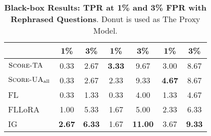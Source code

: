 \begin{table}[t]
\begin{minipage}{0.43\textwidth}
{\begin{tabular}{lcccccc}
             \cmidrule(l){4-5}
             \cmidrule(l){6-7}
             & 1\% & 3\% & 1\% & 3\% & 1\% & 3\% \\
            \midrule
            $\textsc{Score-TA}$& 0.33 & 2.67 & \textbf{3.33} & 9.67 & 3.00 & 8.67 \\
            $\textsc{Score-UA}_{\text{all}}$& 0.33 & 2.67 & 2.33 & 9.33 & \textbf{4.67} & 8.67 \\
            \midrule
            FL & 0.33 & 1.33 & 0.33 & 4.00 & 1.33 & 4.67 \\
            FLLoRA & 1.00 & 5.33 & 1.67 & 5.00 & 2.33 & 6.33 \\
            IG & \textbf{2.67} & \textbf{6.33} & 1.67 & \textbf{11.00} & 3.67 & \textbf{9.33} \\
            \bottomrule
            \end{tabular}
        }
    \caption{\textbf{Black-box Results: TPR at 1\% and 3\% FPR with Rephrased Questions}. Donut is used as The Proxy Model.}
    \label{tab:tpr@fpr_rephrased_question_blackbox}    
    \end{minipage}
    \vskip -0.2in
\end{table}



